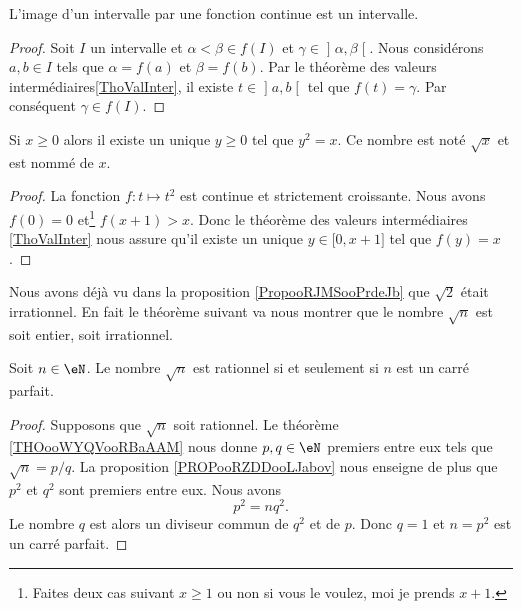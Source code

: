 \begin{corollary}       \label{CorImInterInter}
L'image d'un intervalle par une fonction continue est un intervalle.
\end{corollary}

\begin{proof}
Soit \( I\) un intervalle et \( \alpha<\beta\in f(I)\) et \( \gamma\in\mathopen] \alpha , \beta \mathclose[\). Nous considérons \(a,b\in I\) tels que \( \alpha=f(a)\) et \( \beta=f(b)\). Par le théorème des valeurs intermédiaires\ref{ThoValInter}, il existe \( t\in\mathopen] a , b \mathclose[\) tel que \( f(t)=\gamma\). Par conséquent \( \gamma\in f(I)\).
\end{proof}

\begin{corollaryDef}
    Si \( x\geq 0\) alors il existe un unique \( y\geq 0\) tel que \( y^2=x\). Ce nombre est noté \( \sqrt{x}\) et est nommé  de \( x\).
\end{corollaryDef}

\begin{proof}
    La fonction \( f\colon t\mapsto t^2\) est continue et strictement croissante. Nous avons \( f(0)=0\) et\footnote{Faites deux cas suivant \( x\geq 1\) ou non si vous le voulez, moi je prends \( x+1\).} \( f(x+1)>x\). Donc le théorème des valeurs intermédiaires \ref{ThoValInter} nous assure qu'il existe un unique \( y\in\mathopen[ 0 , x+1 \mathclose]\) tel que \( f(y)=x\).
\end{proof}

Nous avons déjà vu dans la proposition \ref{PropooRJMSooPrdeJb} que \( \sqrt{2}\) était irrationnel. En fait le théorème suivant va nous montrer que le nombre \( \sqrt{ n }\) est soit entier, soit irrationnel.
\begin{theorem}     \label{THOooYXJIooWcbnbm}
    Soit \( n\in \eN\). Le nombre \( \sqrt{n}\) est rationnel si et seulement si \( n\) est un carré parfait.
\end{theorem}

\begin{proof}
    Supposons que \( \sqrt{n}\) soit rationnel. Le théorème \ref{THOooWYQVooRBaAAM} nous donne \( p,q\in \eN\) premiers entre eux tels que \( \sqrt{n}=p/q\). La proposition \ref{PROPooRZDDooLJabov} nous enseigne de plus que \( p^2\) et \( q^2\) sont premiers entre eux. Nous avons
    \begin{equation}
        p^2=nq^2.
    \end{equation}
    Le nombre $q$ est alors un diviseur commun de \( q^2\) et de \( p\). Donc \( q=1\) et \( n=p^2\) est un carré parfait.
\end{proof}


